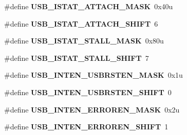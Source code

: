 \begin{DoxyCompactItemize}
\item 
\#define {\bfseries U\+S\+B\+\_\+\+I\+S\+T\+A\+T\+\_\+\+A\+T\+T\+A\+C\+H\+\_\+\+M\+A\+SK}~0x40u\hypertarget{group__USB__Register__Masks_gaad79229bb3a2c9199b50a86a8f4c49fa}{}\label{group__USB__Register__Masks_gaad79229bb3a2c9199b50a86a8f4c49fa}

\item 
\#define {\bfseries U\+S\+B\+\_\+\+I\+S\+T\+A\+T\+\_\+\+A\+T\+T\+A\+C\+H\+\_\+\+S\+H\+I\+FT}~6\hypertarget{group__USB__Register__Masks_ga7820c4cabf21bbbab066e4db9f2bb4b1}{}\label{group__USB__Register__Masks_ga7820c4cabf21bbbab066e4db9f2bb4b1}

\item 
\#define {\bfseries U\+S\+B\+\_\+\+I\+S\+T\+A\+T\+\_\+\+S\+T\+A\+L\+L\+\_\+\+M\+A\+SK}~0x80u\hypertarget{group__USB__Register__Masks_gaab3ce766c4d9a80eaddf42589789ab2d}{}\label{group__USB__Register__Masks_gaab3ce766c4d9a80eaddf42589789ab2d}

\item 
\#define {\bfseries U\+S\+B\+\_\+\+I\+S\+T\+A\+T\+\_\+\+S\+T\+A\+L\+L\+\_\+\+S\+H\+I\+FT}~7\hypertarget{group__USB__Register__Masks_ga02df98ee1c82991ef063f89d4ef6ce2b}{}\label{group__USB__Register__Masks_ga02df98ee1c82991ef063f89d4ef6ce2b}

\item 
\#define {\bfseries U\+S\+B\+\_\+\+I\+N\+T\+E\+N\+\_\+\+U\+S\+B\+R\+S\+T\+E\+N\+\_\+\+M\+A\+SK}~0x1u\hypertarget{group__USB__Register__Masks_ga67ed1b19b1fe4e25fc5ccf7bf0d42c38}{}\label{group__USB__Register__Masks_ga67ed1b19b1fe4e25fc5ccf7bf0d42c38}

\item 
\#define {\bfseries U\+S\+B\+\_\+\+I\+N\+T\+E\+N\+\_\+\+U\+S\+B\+R\+S\+T\+E\+N\+\_\+\+S\+H\+I\+FT}~0\hypertarget{group__USB__Register__Masks_gaf3b53207fe24da42d123d8e94494b72f}{}\label{group__USB__Register__Masks_gaf3b53207fe24da42d123d8e94494b72f}

\item 
\#define {\bfseries U\+S\+B\+\_\+\+I\+N\+T\+E\+N\+\_\+\+E\+R\+R\+O\+R\+E\+N\+\_\+\+M\+A\+SK}~0x2u\hypertarget{group__USB__Register__Masks_gaf660b76755baff6ed122be3eba21723b}{}\label{group__USB__Register__Masks_gaf660b76755baff6ed122be3eba21723b}

\item 
\#define {\bfseries U\+S\+B\+\_\+\+I\+N\+T\+E\+N\+\_\+\+E\+R\+R\+O\+R\+E\+N\+\_\+\+S\+H\+I\+FT}~1\hypertarget{group__USB__Register__Masks_ga38c74121b3660065935c4f639f987b3c}{}\label{group__USB__Register__Masks_ga38c74121b3660065935c4f639f987b3c}


\end{DoxyCompactItemize}
